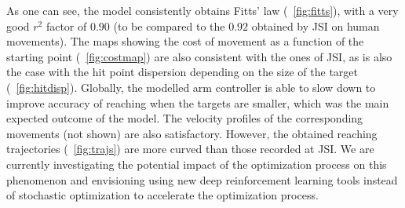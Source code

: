 As one can see, the model consistently obtains Fitts' law (\figurename~\ref{fig:fitts}), with a very good $r^2$ factor of $0.90$ (to be compared to the $0.92$ obtained by JSI on human movements). The maps showing the cost of movement as a function of the starting point (\figurename~\ref{fig:costmap}) are also consistent with the ones of JSI, as is also the case with the hit point dispersion depending on the size of the target (\figurename~\ref{fig:hitdisp}). Globally, the modelled arm controller is able to slow down to improve accuracy of reaching when the targets are smaller, which was the main expected outcome of the model. The velocity profiles of the corresponding movements (not shown) are also satisfactory.
However, the obtained reaching trajectories (\figurename~\ref{fig:trajs}) are more curved than those recorded at JSI. We are currently investigating the potential impact of the optimization process on this phenomenon and envisioning using new deep reinforcement learning tools \cite{lillicrap2015continuous} instead of stochastic optimization \cite{hansen2003reducing} to accelerate the optimization process.
 


 
